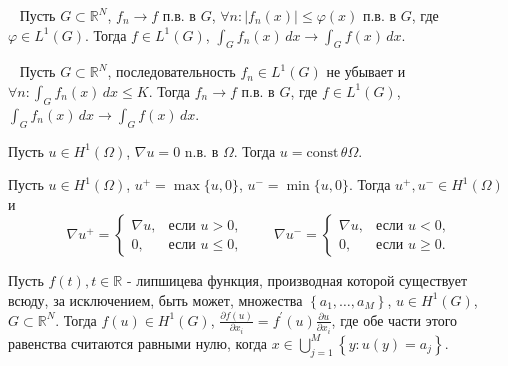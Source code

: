 \begin{theorem}[Лебег]
    \label{th:lebeg}~\cite[321]{Kolmogorov2004}
    Пусть $G \subset \mathbb{R}^N$, $f_n \to f$ п.в. в $G$,
    $\forall n : |f_n(x)| \leq \varphi(x)$ п.в. в $G$,
    где $\varphi \in L^1(G)$.
    Тогда $f \in L^1(G)$, $\int_{G} f_n(x) \, dx \to \int_{G} f(x) \, dx$.
\end{theorem}

\begin{theorem}[Леви]
    \label{th:levi}~\cite[322]{Kolmogorov2004}
    Пусть $G \subset \mathbb{R}^N$, последовательность $f_n \in L^1(G)$
    не убывает и $\forall n : \int_{G} f_n(x) \, dx \leq K$.
    Тогда $f_n \to f$ п.в. в $G$, где $f \in L^1(G)$,
    $\int_{G} f_n(x) \, dx \to \int_{G} f(x) \, dx$.
\end{theorem}

\begin{lemma}
    \label{lm:1_5:15}\cite[47]{Ziemer1989}
    Пусть $u \in H^{1}(\Omega)$, $\nabla u = 0$ n.в. в $\Omega$.
    Тогда $u = \text{const}\, \theta \Omega$.
\end{lemma}

\begin{lemma}
    \label{lm:1_5:16}\cite[47]{Kinderlehrer1983}
    Пусть $u \in H^{1}(\Omega)$, $u^{+} = \max \{u, 0\}$,
    $u^{-} = \min \{u, 0\}$.
    Тогда $u^{+}, u^{-} \in H^{1}(\Omega)$ и
    \[
        \nabla u^{+} =
        \begin{cases}
            \nabla u, & \text{если } u > 0, \\
            0, & \text{если } u \leq 0,
        \end{cases}
        \qquad
        \nabla u^{-} =
        \begin{cases}
            \nabla u, & \text{если } u < 0, \\
            0, & \text{если } u \geq 0.
        \end{cases}
    \]
\end{lemma}

\begin{lemma}
    \label{lm:1_5:lipshitz}\cite[50]{Kinderlehrer1983}
    Пусть $f(t), t \in \mathbb{R}$ - липшицева функция,
    производная которой существует всюду, за исключением,
    быть может, множества $\left\{a_{1}, \ldots, a_{M}\right\}$,
    $u \in H^{1}(G)$, $G \subset \mathbb{R}^{N}$.
    Тогда $f(u) \in H^{1}(G)$,
    $\frac{\partial f(u)}{\partial x_{i}} = f^{\prime}(u)
    \frac{\partial u}{\partial x_{i}}$,
    где обе части этого равенства считаются равными нулю,
    когда $x \in \bigcup_{j=1}^{M}\left\{y: u(y)=a_{j}\right\}$.
\end{lemma}

